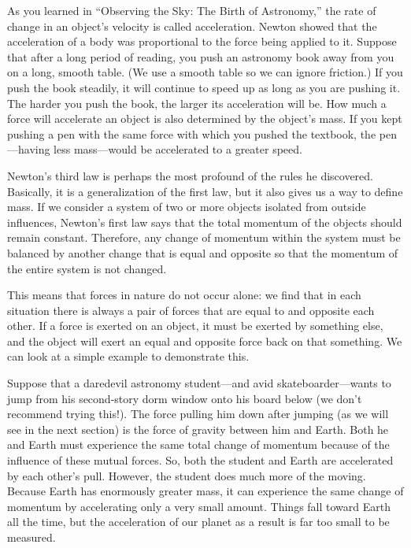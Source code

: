 \documentclass[main-astronomy.tex]{subfiles}
\begin{document}
\vspace{1em}

As you learned in ``Observing the Sky: The Birth of Astronomy,'' the rate of change in an object’s velocity is called acceleration. Newton showed that the acceleration of a body was proportional to the force being applied to it. Suppose that after a long period of reading, you push an astronomy book away from you on a long, smooth table. (We use a smooth table so we can ignore friction.) If you push the book steadily, it will continue to speed up as long as you are pushing it. The harder you push the book, the larger its acceleration will be. How much a force will accelerate an object is also determined by the object’s mass. If you kept pushing a pen with the same force with which you pushed the textbook, the pen---having less mass---would be accelerated to a greater speed.

\vspace{1em}

Newton’s third law is perhaps the most profound of the rules he discovered. Basically, it is a generalization of the first law, but it also gives us a way to define mass. If we consider a system of two or more objects isolated from outside influences, Newton’s first law says that the total momentum of the objects should remain constant. Therefore, any change of momentum within the system must be balanced by another change that is equal and opposite so that the momentum of the entire system is not changed.

\vspace{1em}

This means that forces in nature do not occur alone: we find that in each situation there is always a pair of forces that are equal to and opposite each other. If a force is exerted on an object, it must be exerted by something else, and the object will exert an equal and opposite force back on that something. We can look at a simple example to demonstrate this.

\vspace{1em}

Suppose that a daredevil astronomy student---and avid skateboarder---wants to jump from his second-story dorm window onto his board below (we don’t recommend trying this!). The force pulling him down after jumping (as we will see in the next section) is the force of gravity between him and Earth. Both he and Earth must experience the same total change of momentum because of the influence of these mutual forces. So, both the student and Earth are accelerated by each other’s pull. However, the student does much more of the moving. Because Earth has enormously greater mass, it can experience the same change of momentum by accelerating only a very small amount. Things fall toward Earth all the time, but the acceleration of our planet as a result is far too small to be measured.
\end{document}
